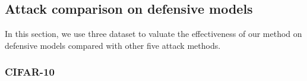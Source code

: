 \documentclass[lettersize,journal]{IEEEtran}
\begin{document}
	\subsection{Attack comparison on defensive models}
	In this section, we use three dataset to valuate the effectiveness of our method on defensive models compared with other five attack methods.
	
	
	
	\subsubsection{CIFAR-10}
	
\end{document}
